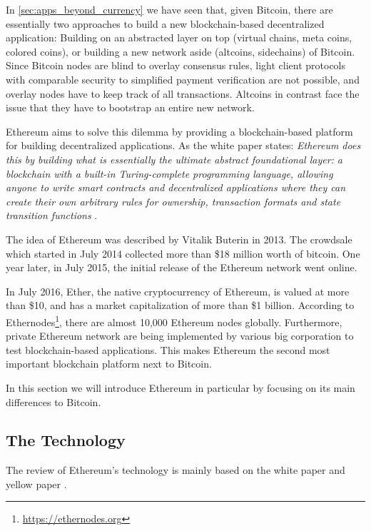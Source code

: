 In \ref{sec:apps_beyond_currency} we have seen that, given Bitcoin, there are essentially two approaches to build a new blockchain-based decentralized application: Building on an abstracted layer on top (virtual chains, meta coins, colored coins), or building a new network aside (altcoins, sidechains) of Bitcoin. Since Bitcoin nodes are blind to overlay consensus rules, light client protocols with comparable security to simplified payment verification are not possible, and overlay nodes have to keep track of all transactions. Altcoins in contrast face the issue that they have to bootstrap an entire new network.

Ethereum aims to solve this dilemma by providing a blockchain-based platform for building decentralized applications. As the white paper states: \emph{Ethereum does this by building what is essentially the ultimate abstract foundational layer: a blockchain with a built-in Turing-complete programming language, allowing anyone to write smart contracts and decentralized applications where they can create their own arbitrary rules for ownership, transaction formats and state transition functions} \parencite{ethereumWhite}.

The idea of Ethereum was described by Vitalik Buterin in 2013. The crowdsale which started in July 2014 collected more than \$18 million worth of bitcoin. One year later, in July 2015, the initial release of the Ethereum network went online. 

In July 2016, Ether, the native cryptocurrency of Ethereum, is valued at more than \$10, and has a market capitalization of more than \$1 billion. According to Ethernodes\footnote{\url{https://ethernodes.org}}, there are almost 10,000 Ethereum nodes globally. Furthermore, private Ethereum network are being implemented by various big corporation to test blockchain-based applications. This makes Ethereum the second most important blockchain platform next to Bitcoin.

In this section we will introduce Ethereum in particular by focusing on its main differences to Bitcoin. 

\subsection{The Technology}
\label{sec:ethereum:tech}

The review of Ethereum's technology is mainly based on the white paper \parencite{ethereumWhite} and yellow paper \parencite{wood2014ethereum}. 

